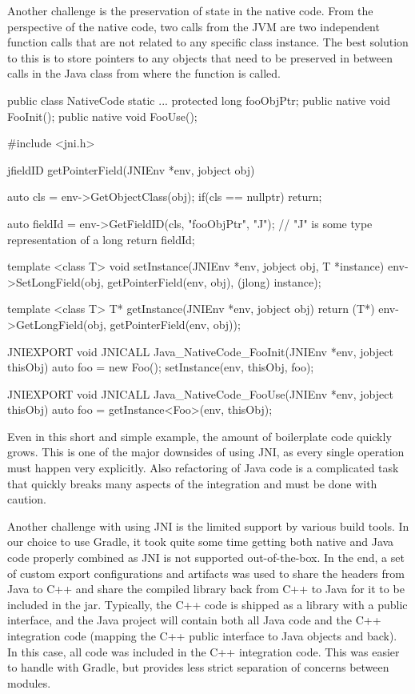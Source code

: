 Another challenge is the preservation of state in the native code. From the perspective of the native code, two calls from the JVM are two independent function calls that are not related to any specific class instance. The best solution to this is to store pointers to any objects that need to be preserved in between calls in the Java class from where the function is called.
\begin{javalong}
public class NativeCode {
    static {...}
    protected long fooObjPtr;
    public native void FooInit();
    public native void FooUse();
}
\end{javalong}
\begin{cpplong}
#include <jni.h>

jfieldID getPointerField(JNIEnv *env, jobject obj) {
    auto cls = env->GetObjectClass(obj);
    if(cls == nullptr) return;
    
    auto fieldId = env->GetFieldID(cls, "fooObjPtr", "J"); // "J" is some type representation of a long
    return fieldId;
}

template <class T> void setInstance(JNIEnv *env, jobject obj, T *instance) {
    env->SetLongField(obj, getPointerField(env, obj), (jlong) instance);
}

template <class T> T* getInstance(JNIEnv *env, jobject obj) {
    return (T*) env->GetLongField(obj, getPointerField(env, obj));
}

JNIEXPORT void JNICALL Java_NativeCode_FooInit(JNIEnv *env, jobject thisObj) {
    auto foo = new Foo();
    setInstance(env, thisObj, foo);
}

JNIEXPORT void JNICALL Java_NativeCode_FooUse(JNIEnv *env, jobject thisObj) {
    auto foo = getInstance<Foo>(env, thisObj);
}
\end{cpplong}

Even in this short and simple example, the amount of boilerplate code quickly grows. This is one of the major downsides of using JNI, as every single operation must happen very explicitly. Also refactoring of Java code is a complicated task that quickly breaks many aspects of the integration and must be done with caution.

Another challenge with using JNI is the limited support by various build tools. In our choice to use Gradle, it took quite some time getting both native and Java code properly combined as JNI is not supported out-of-the-box. In the end, a set of custom export configurations and artifacts was used to share the headers from Java to C++ and share the compiled library back from C++ to Java for it to be included in the jar. Typically, the C++ code is shipped as a library with a public interface, and the Java project will contain both all Java code and the C++ integration code (mapping the C++ public interface to Java objects and back). In this case, all code was included in the C++ integration code. This was easier to handle with Gradle, but provides less strict separation of concerns between modules.

